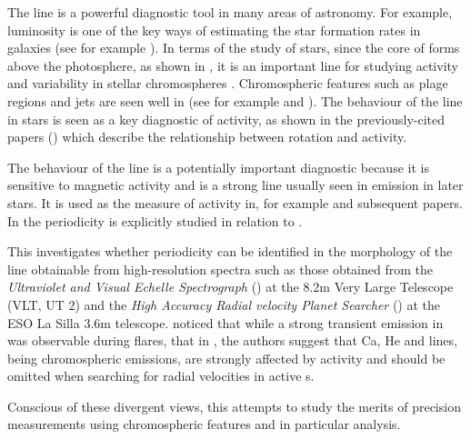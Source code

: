 The {\ha} line is a powerful diagnostic tool in many areas of astronomy. For example, {\ha} luminosity is one of the key
ways of estimating the star formation rates in galaxies (see for example \citet{rosagonzalez02}).
In terms of the study of stars, since the core of {\ha} forms above the photosphere, as shown in \citet{vernazza81}, it
is an important line for studying activity and variability in stellar chromospheres \citep{hall08}. Chromospheric
features such as plage regions and jets are seen well in {\ha} (see for example \citet{kneer10} and \citet{kuridze11}).
The behaviour of the {\ha} line in {\rdwarf} stars is seen as a key diagnostic of activity, as shown in the
previously-cited papers (\citealt{mohanty02, mohanty03, reiners08, schmidt15}) which describe the relationship between
rotation and activity.

The behaviour of the {\ha} line is a potentially important diagnostic because it is sensitive to magnetic activity and
is a strong line usually seen in emission in later {\rdwarf} stars. It is used as the measure of activity in, for
example \citet{mohanty03} and subsequent papers. In \citet{hatzes16} the {\ha} periodicity is explicitly studied in
relation to .

This {\paperorthesis} investigates whether periodicity can be identified in the morphology of the {\ha} line obtainable
from high-resolution spectra such as those obtained from the \textit{Ultraviolet and Visual Echelle Spectrograph}
({\uves}) at the 8.2m Very Large Telescope (VLT, UT 2) and the \textit{High Accuracy Radial velocity Planet Searcher}
({\harps}) at the ESO La Silla 3.6m telescope. \citet{barnes14} noticed that while a strong transient emission in {\ha}
was observable during flares,  that in \citet{reiners09}, the authors suggest that Ca, He and
{\ha} lines, being chromospheric emissions, are strongly affected by activity and should be omitted when searching for
radial velocities in active \rdwarf s.

Conscious of these divergent views, this {\paperorthesis} attempts to study the merits of precision measurements using
chromospheric features and in particular {\ha} analysis.

\section{\prox}
\protect\label{section:introprox}


